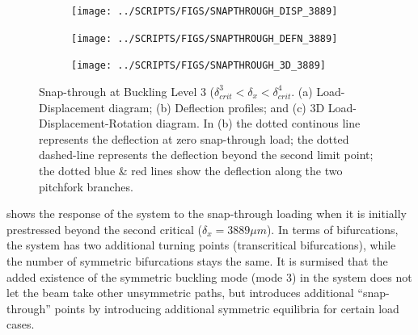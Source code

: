\documentclass[10pt]{article}
\begin{document}
\begin{figure}[!h]
  \centering
  \begin{subfigure}[!t]{0.33\linewidth}
    \centering    
    \texttt{[image: ../SCRIPTS/FIGS/SNAPTHROUGH\_DISP\_3889]}
    \caption{}
  \end{subfigure}%
  \begin{subfigure}[!t]{0.33\linewidth}
    \centering    
    \texttt{[image: ../SCRIPTS/FIGS/SNAPTHROUGH\_DEFN\_3889]}
    \caption{}
  \end{subfigure}%
  \begin{subfigure}[!t]{0.33\linewidth}
    \centering
    \texttt{[image: ../SCRIPTS/FIGS/SNAPTHROUGH\_3D\_3889]}
    \caption{}
  \end{subfigure}
  \caption{Snap-through at Buckling Level 3 ($\delta_{crit}^3 <
    \delta_x < \delta_{crit}^4$. (a) Load-Displacement diagram; (b)
    Deflection profiles; and (c) 3D Load-Displacement-Rotation
    diagram. In (b) the dotted continous line represents
    the deflection at zero snap-through load; the dotted dashed-line
    represents the deflection beyond the second limit point; the
    dotted blue \& red lines show the deflection along the two
    pitchfork branches.}
  \label{fig:buck3}
\end{figure}

 shows the response of the system to the snap-through
loading when it is initially prestressed beyond the second critical
($\delta_x = 3889\mu m$). In terms of bifurcations, the system has two
additional turning points (transcritical bifurcations), while the
number of symmetric bifurcations stays the same. It is surmised that
the added existence of the symmetric buckling mode (mode 3) in the
system does not let the beam take other unsymmetric paths, but
introduces additional ``snap-through'' points by introducing
additional symmetric equilibria for certain load cases.
\end{document}
